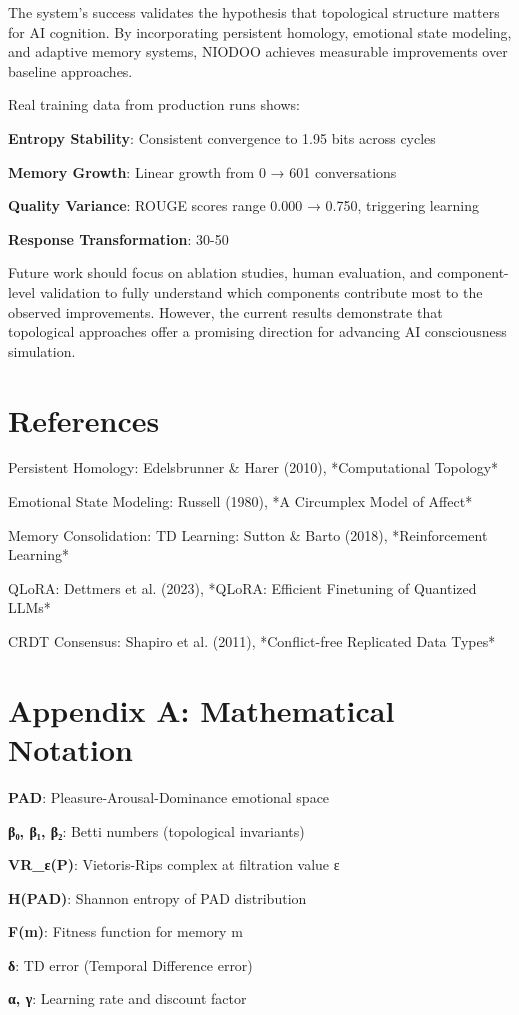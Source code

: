 \documentclass[11pt,a4paper]{article}
\begin{document}
The system's success validates the hypothesis that topological structure matters for AI cognition. By incorporating persistent homology, emotional state modeling, and adaptive memory systems, NIODOO achieves measurable improvements over baseline approaches.

Real training data from production runs shows:
\item \textbf{Entropy Stability}: Consistent convergence to 1.95 bits across cycles
\item \textbf{Memory Growth}: Linear growth from 0 → 601 conversations
\item \textbf{Quality Variance}: ROUGE scores range 0.000 → 0.750, triggering learning
\item \textbf{Response Transformation}: 30-50%

Future work should focus on ablation studies, human evaluation, and component-level validation to fully understand which components contribute most to the observed improvements. However, the current results demonstrate that topological approaches offer a promising direction for advancing AI consciousness simulation.

\section{References}

\item Persistent Homology: Edelsbrunner & Harer (2010), *Computational Topology*
\item Emotional State Modeling: Russell (1980), *A Circumplex Model of Affect*
\item Memory Consolidation: TD Learning: Sutton & Barto (2018), *Reinforcement Learning*
\item QLoRA: Dettmers et al. (2023), *QLoRA: Efficient Finetuning of Quantized LLMs*
\item CRDT Consensus: Shapiro et al. (2011), *Conflict-free Replicated Data Types*

\section{Appendix A: Mathematical Notation}

\item \textbf{PAD}: Pleasure-Arousal-Dominance emotional space
\item \textbf{β₀, β₁, β₂}: Betti numbers (topological invariants)
\item \textbf{VR_ε(P)}: Vietoris-Rips complex at filtration value ε
\item \textbf{H(PAD)}: Shannon entropy of PAD distribution
\item \textbf{F(m)}: Fitness function for memory m
\item \textbf{δ}: TD error (Temporal Difference error)
\item \textbf{α, γ}: Learning rate and discount factor
\end{document}
